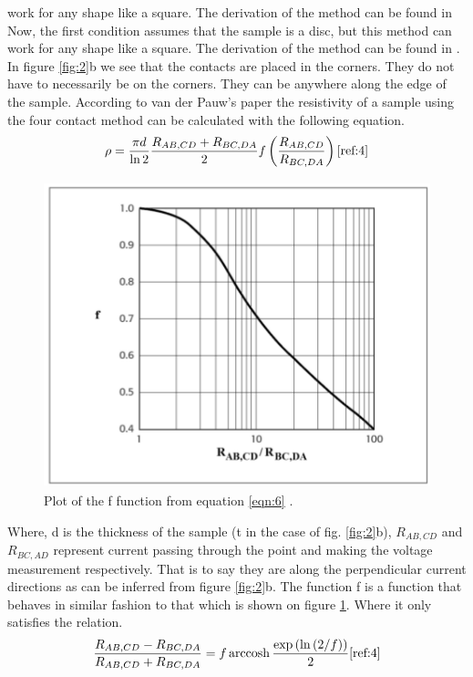 \documentclass[twocolumn]{article}
\DeclareMathOperator{\arccosh}{arccosh}
\begin{document}
work for any shape like a square. The derivation of the method can be found in 
\cite{ref:3}
Now, the first condition assumes that the sample is a disc, but this method can 
work for any shape like a square. The derivation of the method can be found in 
\cite{ref:3}. In figure \ref{fig:2}b we see that the contacts are placed in the 
corners. They do not have to necessarily be on the corners. They can be 
anywhere along the edge of the sample. According to van der Pauw's paper the 
resistivity of a sample using the four contact method can be calculated with 
the following equation.
\begin{equation}
\rho = \frac{\pi d}{\ln{2}}\frac{R_{AB,CD}+R_{BC,DA}}{2}f\left(\frac{R_{AB,CD}}{R_{BC,DA}}\right)
\cite{ref:4}
\label{eqn:7}
\end{equation}
\begin{figure}
\includegraphics[width=\textwidth,height=3.5in]{f-function.png}
\caption{Plot of the f function from equation \ref{eqn:6} \cite{ref:3}.}
\label{fig:3}
\end{figure}
Where, d is the thickness of the sample (t in the case of fig. \ref{fig:2}b), 
$R_{AB,CD}$ and $R_{BC,AD}$ represent current passing through the point and 
making the voltage measurement respectively. That is to say they are along the 
perpendicular current directions as can be inferred from figure \ref{fig:2}b. 
The function f is a function that behaves in 
similar fashion to that which is shown on figure \ref{fig:3}. Where it only 
satisfies the relation.
\begin{equation}
\frac{R_{AB,CD}-R_{BC,DA}}{R_{AB,CD}+R_{BC,DA}} = f\arccosh{\frac{\exp{(\ln{(2/f)})}}{2}}
\cite{ref:4}
\label{eqn:8}
\end{equation}
\end{document}
